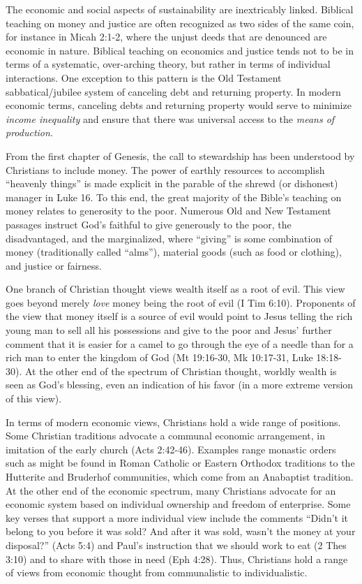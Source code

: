 \documentclass[12pt]{article}
\begin{document}
The economic and social aspects of sustainability are inextricably linked. Biblical teaching on money
and justice are often recognized as two sides of the same coin, for instance in Micah 2:1-2, where the unjust deeds that
are denounced are economic in nature. Biblical teaching on economics and justice tends not to be in terms of a
systematic, over-arching theory, but rather in terms of individual interactions.
One exception to this pattern is the Old Testament sabbatical/jubilee system of canceling debt and returning property. 
In modern economic terms, canceling debts and returning property would serve to minimize 
\emph{income inequality} and ensure that there was universal access to the \emph{means of production}.

From the first chapter of Genesis, the call to stewardship has
been understood by Christians to include money. The power of earthly resources to accomplish ``heavenly things'' is made
explicit in the parable of the shrewd (or dishonest) manager in Luke 16. To this end, the great majority of the Bible's
teaching on money relates to generosity to the poor. Numerous Old and New Testament passages instruct God's faithful to
give generously to the poor, the disadvantaged, and the marginalized, where ``giving'' is some combination of money
(traditionally called ``alms''), material goods (such as food or clothing), and justice or fairness.

One branch of Christian thought views wealth itself as a root of evil. This view goes beyond merely \emph{love} money
being the root of evil (I Tim 6:10). Proponents of the view that money itself is a source of evil would point to Jesus
telling the rich young man to sell all his possessions and give to the poor and Jesus' further comment that it is easier
for a camel to go through the eye of a needle than for a rich man to enter the kingdom of God (Mt 19:16-30, Mk 10:17-31,
Luke 18:18-30). At the other end of the spectrum of Christian thought, worldly wealth is seen as God's blessing, even an
indication of his favor (in a more extreme version of this view).

In terms of modern economic views, Christians hold a wide range of positions. Some Christian traditions advocate a
communal economic arrangement, in imitation of the early church (Acts 2:42-46). Examples range monastic orders such as
might be found in Roman Catholic or Eastern Orthodox traditions to the Hutterite and Bruderhof communities, which come
from an Anabaptist tradition. At the other end of the economic spectrum, many Christians advocate for an economic system
based on individual ownership and freedom of enterprise. Some key verses that support a more individual view include the
comments ``Didn’t it belong to you before it was sold? And after it was sold, wasn’t the money at your disposal?'' (Acts
5:4) and Paul's instruction that we should work to eat (2 Thes 3:10) and to share with those in need (Eph 4:28).
Thus, Christians hold a range of views from economic thought from communalistic to individualistic.
\end{document}
